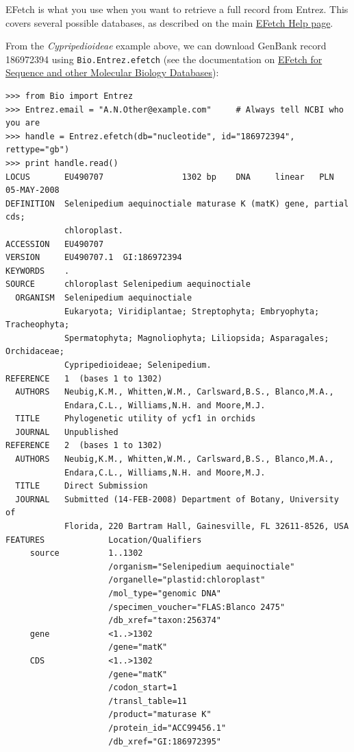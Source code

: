 \documentclass{report}
\begin{document}
EFetch is what you use when you want to retrieve a full record from Entrez.
This covers several possible databases, as described on the main \href{http://eutils.ncbi.nlm.nih.gov/entrez/query/static/efetch\_help.html}{EFetch Help page}.

From the \emph{Cypripedioideae} example above, we can download GenBank record 186972394 using \verb+Bio.Entrez.efetch+ (see the documentation on
\href{http://www.ncbi.nlm.nih.gov/entrez/query/static/efetchseq_help.html}
{EFetch for Sequence and other Molecular Biology Databases}):

\begin{verbatim}
>>> from Bio import Entrez
>>> Entrez.email = "A.N.Other@example.com"     # Always tell NCBI who you are
>>> handle = Entrez.efetch(db="nucleotide", id="186972394", rettype="gb")
>>> print handle.read()
LOCUS       EU490707                1302 bp    DNA     linear   PLN 05-MAY-2008
DEFINITION  Selenipedium aequinoctiale maturase K (matK) gene, partial cds;
            chloroplast.
ACCESSION   EU490707
VERSION     EU490707.1  GI:186972394
KEYWORDS    .
SOURCE      chloroplast Selenipedium aequinoctiale
  ORGANISM  Selenipedium aequinoctiale
            Eukaryota; Viridiplantae; Streptophyta; Embryophyta; Tracheophyta;
            Spermatophyta; Magnoliophyta; Liliopsida; Asparagales; Orchidaceae;
            Cypripedioideae; Selenipedium.
REFERENCE   1  (bases 1 to 1302)
  AUTHORS   Neubig,K.M., Whitten,W.M., Carlsward,B.S., Blanco,M.A.,
            Endara,C.L., Williams,N.H. and Moore,M.J.
  TITLE     Phylogenetic utility of ycf1 in orchids
  JOURNAL   Unpublished
REFERENCE   2  (bases 1 to 1302)
  AUTHORS   Neubig,K.M., Whitten,W.M., Carlsward,B.S., Blanco,M.A.,
            Endara,C.L., Williams,N.H. and Moore,M.J.
  TITLE     Direct Submission
  JOURNAL   Submitted (14-FEB-2008) Department of Botany, University of
            Florida, 220 Bartram Hall, Gainesville, FL 32611-8526, USA
FEATURES             Location/Qualifiers
     source          1..1302
                     /organism="Selenipedium aequinoctiale"
                     /organelle="plastid:chloroplast"
                     /mol_type="genomic DNA"
                     /specimen_voucher="FLAS:Blanco 2475"
                     /db_xref="taxon:256374"
     gene            <1..>1302
                     /gene="matK"
     CDS             <1..>1302
                     /gene="matK"
                     /codon_start=1
                     /transl_table=11
                     /product="maturase K"
                     /protein_id="ACC99456.1"
                     /db_xref="GI:186972395"

\end{verbatim}
\end{document}
